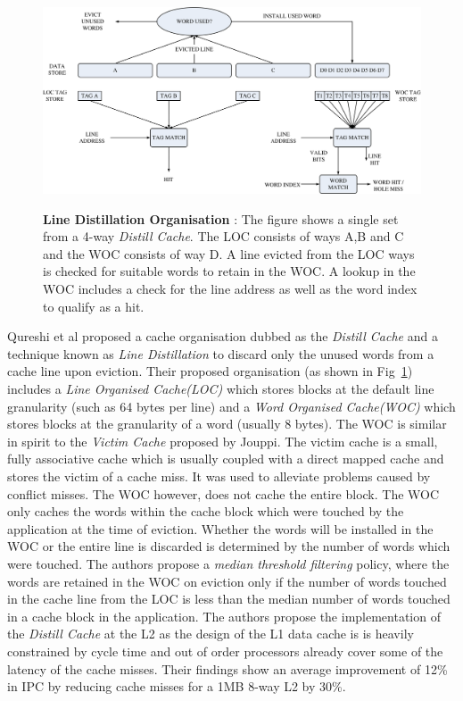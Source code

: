 \begin{figure}[h]
  \centering
  \includegraphics[width=\textwidth]{files/Figures/06-LDIS.pdf}
  \\
  \caption[Line Distillation]{\textbf{Line Distillation Organisation} : The figure shows a single set from a 4-way \textit{Distill Cache}. The LOC consists of ways A,B and C and the WOC consists of way D. A line evicted from the LOC ways is checked for suitable words to retain in the WOC. A lookup in the WOC includes a check for the line address as well as the word index to qualify as a hit.}
  \label{fig:ldis}
\end{figure}

Qureshi et al\cite{Qureshi:2007:LDIS} proposed a cache organisation dubbed as the \textit{Distill Cache} and a technique known as \textit{Line Distillation} to discard only the unused words from a cache line upon eviction. Their proposed organisation (as shown in Fig~\ref{fig:ldis}) includes a \textit{Line Organised Cache(LOC)} which stores blocks at the default line granularity (such as 64 bytes per line) and a \textit{Word Organised Cache(WOC)} which stores blocks at the granularity of a word (usually 8 bytes). The WOC is similar in spirit to the \textit{Victim Cache}\cite{Jouppi:1990:IDC:325164.325162} proposed by Jouppi. The victim cache is a small, fully associative cache which is usually coupled with a direct mapped cache and stores the victim of a cache miss. It was used to alleviate problems caused by conflict misses. The WOC however, does not cache the entire block. The WOC only caches the words within the cache block which were touched by the application at the time of eviction. Whether the words will be installed in the WOC or the entire line is discarded is determined by the number of words which were touched. The authors propose a \textit{median threshold filtering} policy, where the words are retained in the WOC on eviction only if the number of words touched in the cache line from the LOC is less than the median number of words touched in a cache block in the application. The authors propose the implementation of the \textit{Distill Cache} at the L2 as the design of the L1 data cache is is heavily constrained by cycle time and out of order processors already cover some of the latency of the cache misses. Their findings show an average improvement of 12\% in IPC by reducing cache misses for a 1MB 8-way L2 by 30\%.

